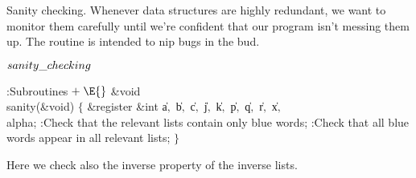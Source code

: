 Sanity checking. Whenever data structures are
highly redundant,
we want to monitor them carefully until we're confident that our
program isn't messing them up. The  routine is intended to
nip bugs in the bud.

\Y\B\4\D$\\{sanity\_checking}$ \5
\par
\Y\B\4:Subroutines\X${}\mathrel+\E{}$\6
\&{void} \\{sanity}(\&{void})\1\1\2\2\6
${}\{{}$\1\6
\&{register} \&{int} \|a${},{}$ \|b${},{}$ \|c${},{}$ \|j${},{}$ \|k${},{}$ %
\|p${},{}$ \|q${},{}$ \|r${},{}$ \|x${},{}$ \\{alpha};\7
:Check that the relevant lists contain only blue words\X;\6
:Check that all blue words appear in all relevant lists\X;\6
\4${}\}{}$\2\par
\fi

Here we check also the inverse property of the
inverse lists.

